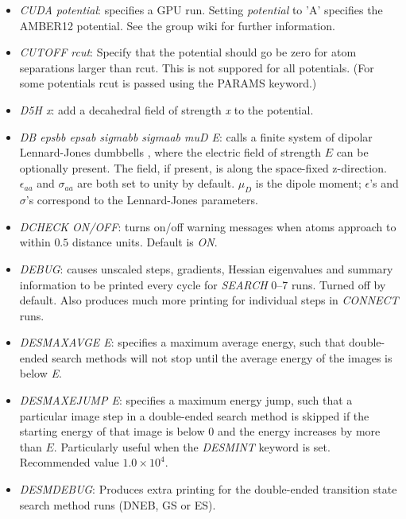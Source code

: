 \documentclass[12pt,a4paper,dvips]{article}
\begin{document}
\begin{itemize}
\item {\it CUDA potential\/}: specifies a GPU run. Setting {\it potential} to 'A' specifies the AMBER12 potential. See the group wiki for further information.

\item {\it CUTOFF rcut\/}: Specify that the potential should go be zero for
  atom separations larger than rcut. This is not suppored for all potentials.
  (For some potentials rcut is passed using the PARAMS keyword.)

\item {\it D5H x\/}: add a decahedral field of strength {\it x} to the potential.

\item {\it DB epsbb epsab sigmabb sigmaab muD E\/}: calls
a finite system of dipolar Lennard-Jones dumbbells \cite{ChakrabartiFW09}, where the electric field of strength $E$ can be
optionally present. The field, if present, is along the space-fixed z-direction. $\epsilon_{aa}$
and $\sigma_{aa}$ are both set to unity by default. $\mu_{D}$ is the dipole moment; $\epsilon$'s
and $\sigma$'s correspond to the Lennard-Jones parameters.

\item {\it DCHECK ON/OFF\/}: turns on/off warning messages when atoms
approach to within $0.5$ distance units. Default is {\it ON\/}.

\item {\it DEBUG\/}: causes unscaled steps, gradients, Hessian eigenvalues and
summary information to be printed every cycle for {\it SEARCH} 0--7 runs. Turned off by default.
Also produces much more printing for individual steps in {\it CONNECT\/} runs.

\item {\it DESMAXAVGE E\/}: specifies a maximum average energy, such that
  double-ended search methods will not stop until the average energy of the
  images is below {\it E\/}. 

\item {\it DESMAXEJUMP E\/}: specifies a maximum energy jump, such that a
  particular image step in a double-ended search method is skipped if the
  starting energy of that image is below $0$ and the energy increases by more
  than $E$. Particularly useful when the {\it DESMINT\/} keyword is
  set. Recommended value $1.0\times10^4$.

\item {\it DESMDEBUG\/}: Produces extra printing for the double-ended
  transition state search method runs (DNEB, GS or ES).


\end{itemize}
\end{document}
